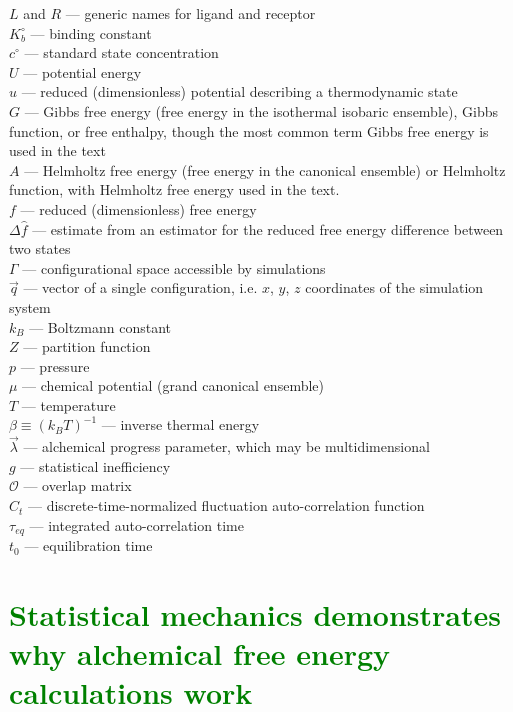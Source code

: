 \documentclass[9pt,bestpractices]{livecoms}
\newcommand{\tocgreen}[1]{\textcolor{green}{#1}}
\newcommand{\tocorange}[1]{\textcolor{orange}{#1}}
\begin{document}
\begin{tcolorbox}[title=List of Symbols, colback=green!10!white]
$L$ and $R$ --- generic names for ligand and receptor\\
$K_b^{\circ}$ --- binding  constant \\
$c^{\circ}$ --- standard state concentration \\
$U$ --- potential energy\\
$u$ --- reduced (dimensionless) potential describing a thermodynamic state \\
$G$ --- Gibbs free energy (free energy in the isothermal isobaric ensemble), Gibbs function, or free enthalpy, though the most common term Gibbs free energy is used in the text\\
$A$ --- Helmholtz free energy (free energy in the canonical ensemble) or Helmholtz function, with Helmholtz free energy used in the text.\\
$f$ --- reduced (dimensionless) free energy \\
$\Delta \hat{f}$ --- estimate from an estimator for the reduced free energy difference between two states\\
$\Gamma$ --- configurational space accessible by simulations \\
$\vec{q}$ --- vector of a single configuration, i.e. $x$, $y$, $z$ coordinates of the simulation system\\
$k_B$ --- Boltzmann constant \\
$Z$ --- partition function \\
$p$ --- pressure \\
$\mu$ --- chemical potential (grand canonical ensemble)\\
$T$ --- temperature \\
$\beta \equiv (k_B T)^{-1}$ --- inverse thermal energy \\
$\vec{\lambda}$ --- alchemical progress parameter, which may be multidimensional \\
$g$ --- statistical inefficiency\\
$\mathcal{O}$ --- overlap matrix\\
$C_t$ --- discrete-time-normalized fluctuation auto-correlation function\\
$\tau _{eq}$ --- integrated auto-correlation time\\
$t_0$ --- equilibration time
\end{tcolorbox}

\section{\tocgreen{Statistical mechanics demonstrates why alchemical free energy calculations work}}
\label{sec:theory}
\end{document}
